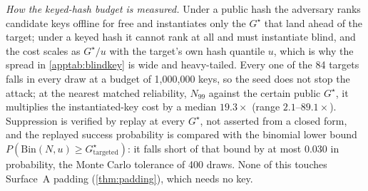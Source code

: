 \emph{How the keyed-hash budget is measured.} Under a public hash the adversary ranks candidate keys
offline for free and instantiates only the $G^{\star}$ that land ahead of the target; under a keyed
hash it cannot rank at all and must instantiate blind, and the cost scales as $G^{\star}/u$ with the
target's own hash quantile $u$, which is why the spread in \cref{apptab:blindkey} is wide and
heavy-tailed. Every one of the 84 targets falls in every draw at a budget of
1{,}000{,}000 keys, so the seed does not stop the attack; at the nearest matched reliability,
$N_{99}$ against the certain public $G^{\star}$, it multiplies the instantiated-key cost by a median
$19.3\times$ (range $2.1$--$89.1\times$). Suppression is
verified by replay at every $G^{\star}$, not asserted from a closed form, and the replayed success
probability is compared with the binomial lower bound $P(\mathrm{Bin}(N,u)\ge G^{\star}_{\text{targeted}})$:
it falls short of that bound by at most 0.030 in probability, the Monte Carlo
tolerance of 400 draws. None of this touches Surface~A padding (\cref{thm:padding}), which
needs no key.
